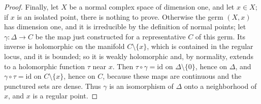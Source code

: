\begin{proof}
Finally, let $X$ be a normal complex space of dimension one, and let $x\in X$; if $x$ is an isolated point, there is nothing to prove. Otherwise the germ $(X,x)$ has dimension one, and it is irreducible by the definition of normal points; let $\gamma\colon\Delta\to C$ be the map just constructed for a representative $C$ of this germ. Its inverse is holomorphic on the manifold $C\setminus\{x\}$, which is contained in the regular locus, and it is bounded; so it is weakly holomorphic and, by normality, extends to a holomorphic function $\tau$ near $x$. Then $\tau\circ\gamma=\mathrm{id}$ on $\Delta\setminus\{0\}$, hence on $\Delta$, and $\gamma\circ\tau=\mathrm{id}$ on $C\setminus\{x\}$, hence on $C$, because these maps are continuous and the punctured sets are dense. Thus $\gamma$ is an isomorphism of $\Delta$ onto a neighborhood of $x$, and $x$ is a regular point.
\end{proof}

